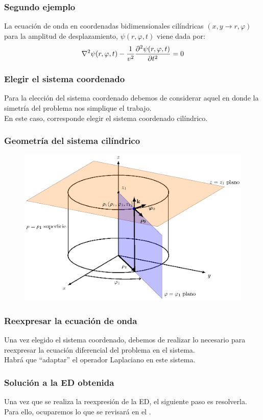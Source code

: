 \documentclass[12pt]{beamer}
\begin{document}
\begin{frame}
\frametitle{Segundo ejemplo}
La ecuación de onda en coordenadas bidimensionales cilíndricas $(x , y \rightarrow r, \varphi)$ para la amplitud de desplazamiento, $\psi (r, \varphi, t)$ viene dada por:
\pause
\begin{align*}
\laplacian \psi (r, \varphi, t) - \dfrac{1}{v^{2}} \pdv[2]{\psi (r, \varphi, t)}{t} = 0
\end{align*}
\end{frame}
\begin{frame}
\frametitle{Elegir el sistema coordenado}
Para la elección del sistema coordenado debemos de considerar aquel en donde la simetría del problema nos simplique el trabajo.
\\
\bigskip
\pause
En este caso, corresponde elegir el sistema coordenado cilíndrico.
\end{frame}
\begin{frame}
\frametitle{Geometría del sistema cilíndrico}
\begin{figure}[H]
  \centering
  \includegraphics[scale=0.7]{Imagenes/Coordenadas_Cilindricas_01.eps}
\end{figure}
\end{frame}
\begin{frame}
\frametitle{Reexpresar la ecuación de onda}
Una vez elegido el sistema coordenado, debemos de realizar lo necesario para reexpresar la ecuación diferencial del problema en el sistema.
\\
\bigskip
\pause
Habrá que \enquote{adaptar} el operador Laplaciano en este sistema.
\end{frame}
\begin{frame}
\frametitle{Solución a la ED obtenida}
Una vez que se realiza la reexpresión de la ED, el siguiente paso es resolverla.
\\
\bigskip
\pause
Para ello, ocuparemos lo que se revisará en el \emph{}.
\end{frame}
\end{document}
